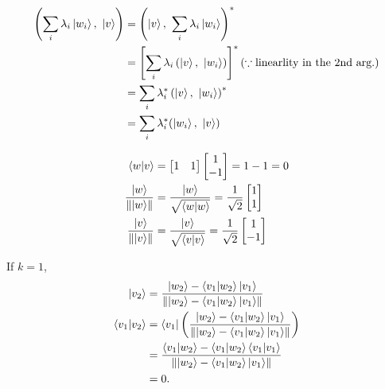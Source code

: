 \begin{align*}
	\left(\sum_i \lambda_i \ket{w_i},\ \ket{v}\right) &=
	\left(\ket{v},\ \sum_i \lambda_i \ket{w_i}\right)^*\\
	&= \left[\sum_i \lambda_i \left(\ket{v},\ \ket{w_i}  \right) \right]^* (\because \text{linearlity in the 2nd arg.})\\
	&= \sum_i \lambda_i^* \left(\ket{v},\ \ket{w_i} \right)^*\\
	&= \sum_i \lambda_i^* (\ket{w_i},\ \ket{v})
\end{align*}



\begin{align*}
	\braket{w | v} &= \begin{bmatrix}
		1 & 1
	\end{bmatrix}
	\begin{bmatrix}
	1 \\
	-1
	\end{bmatrix}
	= 1 - 1 = 0\\
%
	\frac{\ket{w}}{\norm{\ket{w}}} &=
	\frac{\ket{w}}{\sqrt{\braket{w|w}}} = \frac{1}{\sqrt{2}} \begin{bmatrix}
	1 \\
	1
	\end{bmatrix}\\
%
	\frac{\ket{v}}{\norm{\ket{v}}} &=
	\frac{\ket{v}}{\sqrt{\braket{v|v}}} = \frac{1}{\sqrt{2}} \begin{bmatrix}
	1 \\
	-1
	\end{bmatrix}
\end{align*}




If $k = 1$,
\begin{align*}
	\ket{v_2} &= \frac{\ket{w_2} - \braket{v_1 | w_2}\ket{v_1}}{\left\lVert\ket{w_2} - \braket{v_1 | w_2}\ket{v_1}\right\rVert}\\
	\braket{v_1 | v_2} &= \bra{v_1} \left(\frac{\ket{w_2} - \braket{v_1 | w_2}\ket{v_1}}{\left\lVert\ket{w_2} - \braket{v_1 | w_2}\ket{v_1}\right\rVert}\right)\\
		&= \frac{\braket{v_1 | w_2} - \braket{v_1 | w_2}\braket{v_1 | v_1}}{\left\lVert\ket{w_2} - \braket{v_1 | w_2}\ket{v_1}\right\rVert}\\
		&= 0.
\end{align*}

